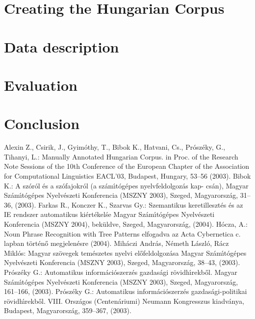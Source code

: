 \documentclass{llncs}
\begin{document}
\section{Creating the Hungarian Corpus}

\section{Data description}

\section{Evaluation}

\section{Conclusion}


%
%
\begin{thebibliography}{15}
%
Alexin Z., Csirik, J., Gyim\'othy, T., Bibok K., Hatvani, Cs.,
Pr\'osz\'eky, G., Tihanyi, L.:
Manually Annotated Hungarian Corpus.
in Proc. of the Research Note Sessions of the 10th Conference
of the European Chapter of the Association for Computational
Linguistics EACL'03, Budapest, Hungary, 53--56 (2003).
%
Bibok K.:
A sz\'or\'ol \'es a sz\'ofajokr\'ol (a sz\'am\'\i t\'og\'epes nyelvfeldolgoz\'as kap- cs\'an),
Magyar Sz\'am\'\i t\'og\'epes Nyelv\'eszeti Konferencia (MSZNY 2003),
Szeged, Magyarorsz\'ag, 31--36, (2003).
%
Farkas R., Konczer K., Szarvas Gy.:
Szemantikus keretilleszt\'es \'es az IE rendszer automatikus ki\'ert\'ekel\'se
Magyar Sz\'am\'\i t\'og\'epes Nyelv\'eszeti Konferencia (MSZNY 2004),
bek\"uldve, Szeged, Magyarorsz\'ag, (2004).
%
H\'ocza, A.:
Noun Phrase Recognition with Tree Patterns
elfogadva az Acta Cybernetica c. lapban t\"ort\'en\H{o} megjelen\'esre (2004).
%
Mih\'aczi Andr\'as, N\'emeth L\'aszl\'o, R\'acz Mikl\'os:
Magyar sz\"ovegek tem\'eszetes nyelvi el\H{o}feldolgoz\'asa
Magyar Sz\'am\'\i t\'og\'epes Nyelv\'eszeti Konferencia (MSZNY 2003),
Szeged, Magyarorsz\'ag, 38--43, (2003).
%
Pr\'osz\'eky G.:
Automatikus inform\'aci\'oszerz\'es gazdas\'agi r\"ovidh\'\i rekb\H{o}l.
Magyar Sz\'am\'\i t\'og\'epes Nyelv\'eszeti Konferencia (MSZNY 2003),
Szeged, Magyarorsz\'ag, 161--166, (2003).
%
Pr\'osz\'eky G.:
Automatikus inform\'aci\'oszerz\'es gazdas\'agi-politikai r\"ovidh\'\i rekb\H{o}l.
VIII. Orsz\'agos (Centen\'ariumi) Neumann Kongresszus kiadv\'anya,
Budapest, Magyarorsz\'ag, 359--367, (2003).
%
\end{thebibliography}
\end{document}
